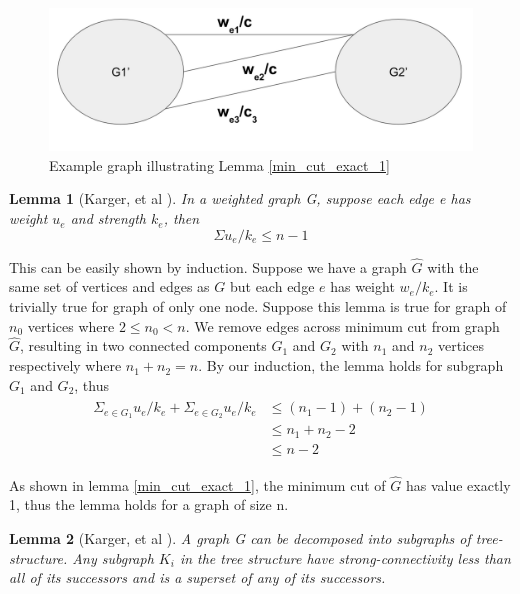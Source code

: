 \documentclass{article}
\newtheorem{lemma}{Lemma}
\begin{document}
\begin{figure}[h!]
\centering
\includegraphics[scale=0.4]{images/mincut.png}
\caption{Example graph illustrating Lemma \ref{min_cut_exact_1}}
\label{fig:ex_strong}
\end{figure}

\begin{lemma}[Karger, et al \cite{benczur2015randomized}] \label{sigma_ue/ke}
In a weighted graph G, suppose each edge e has weight $u_e$ and strength $k_e$, then 
\begin{equation}
\Sigma u_e/k_e \leq n - 1
\end{equation}
\end{lemma}

This can be easily shown by induction. Suppose we have a graph $\hat{G}$ with the same set of vertices and edges as $G$ but each edge $e$ has weight $w_e/k_e$. It is trivially true for graph of only one node. Suppose this lemma is true for graph of $n_0$ vertices where $ 2 \leq n_0 < n$. We remove edges across minimum cut from graph $\hat{G}$, resulting in two connected components $G_1$ and $G_2$ with $n_1$ and $n_2$ vertices respectively where $n_1 + n_2 = n$. By our induction, the lemma holds for subgraph $G_1$ and $G_2$, thus
\begin{align}
    \begin{aligned}
        \Sigma_{e \in G_1} u_e/k_e + \Sigma_{e \in G_2} u_e/k_e 
        & \leq (n_1 - 1) + (n_2 - 1) \\
        & \leq n_1 + n_2 - 2 \\
        & \leq n - 2
    \end{aligned}
\end{align}

As shown in lemma \ref{min_cut_exact_1}, the minimum cut of $\hat{G}$ has value exactly 1, thus the lemma holds for a graph of size n.

\begin{lemma}[Karger, et al \cite{benczur2015randomized} \label{decomposition}]
A graph G can be decomposed into subgraphs of tree-structure. Any subgraph $K_i$ in the tree structure have strong-connectivity less than all of its successors and is a superset of any of its successors.
\end{lemma}
\end{document}
